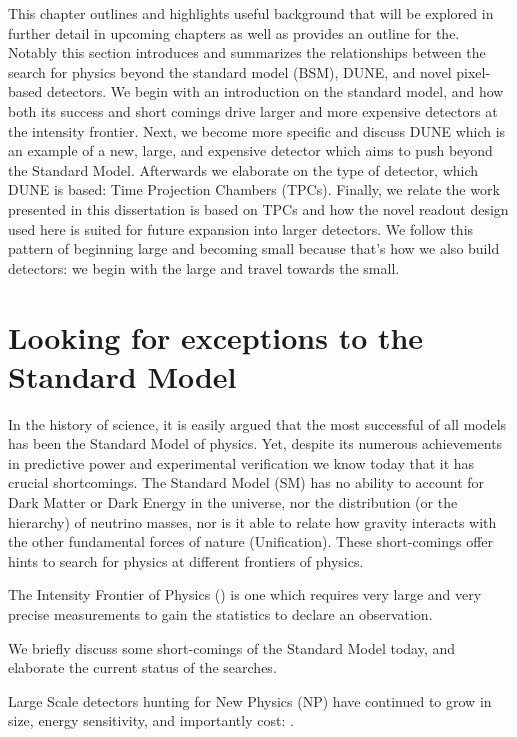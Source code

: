 This chapter outlines and highlights useful background that will be explored in further detail in upcoming chapters as well as provides an outline for the. 
Notably this section introduces and summarizes the relationships between the search for physics beyond the standard model (BSM), DUNE, and novel pixel-based detectors. 
We begin with an introduction on the standard model, and how both its success and short comings drive larger and more expensive detectors at the intensity frontier.
Next, we become more specific and discuss DUNE which is an example of a new, large, and expensive detector which aims to push beyond the Standard Model.
Afterwards we elaborate on the type of detector, which DUNE is based: Time Projection Chambers (TPCs).
Finally, we relate the work presented in this dissertation is based on TPCs and how the novel readout design used here is suited for future expansion into larger detectors.
We follow this pattern of beginning large and becoming small because that's how we also build detectors: we begin with the large and travel towards the small.

\section{Looking for exceptions to the Standard Model}

In the history of science, it is easily argued that the most successful of all models has been the Standard Model of physics. 
Yet, despite its numerous achievements in predictive power and experimental verification we know today that it has crucial shortcomings. 
The Standard Model (SM) has no ability to account for Dark Matter or Dark Energy in the universe, nor the distribution (or the hierarchy) of neutrino masses, nor is it able to relate how gravity interacts with the other fundamental forces of nature (Unification).
These short-comings offer hints to search for physics at different frontiers of physics.

The Intensity Frontier of Physics (\citep{intensityfrontier2012_Hewett}) is one which requires very large and very precise measurements to gain the statistics to declare an observation. 


We briefly discuss some short-comings of the Standard Model today, and elaborate the current status of the searches.

Large Scale detectors hunting for New Physics (NP) have continued to grow in size, energy sensitivity, and importantly cost: \citep{Juno:2022103927}.


